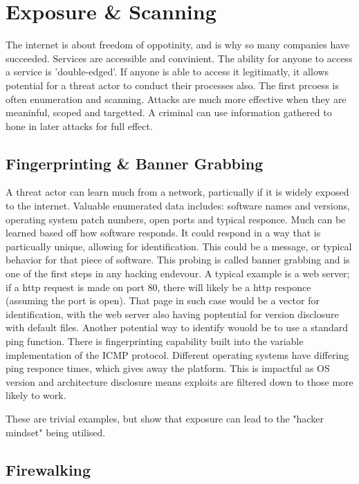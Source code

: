 \section{Exposure \& Scanning}
The internet is about freedom of oppotinity, and is why so many companies have succeeded. Services are accessible and convinient. The ability for anyone to access a service is 'double-edged'.
If anyone is able to access it legitimatly, it allows potential for a threat actor to conduct their processes also. The first prcoess is often enumeration and scanning. Attacks are much more effective when they are meaninful, scoped and targetted.
A criminal can use information gathered to hone in later attacks for full effect.  

\subsection{Fingerprinting \& Banner Grabbing}
A threat actor can learn much from a network, particually if it is widely exposed to the internet. Valuable enumerated data includes: software names and versions, operating system patch numbers, open ports and typical responce.
Much can be learned based off how software responds. It could respond in a way that is particually unique, allowing for identification. This could be a message, or typical behavior for that piece of software.
This probing is called banner grabbing and is one of the first steps in any hacking endevour. A typical example is a web server; if a http request is made on port 80, there will likely be a http responce (assuming the port is open).
That page in such case would be a vector for identification, with the web server also having poptential for version disclosure with default files. Another potential way to identify wouold be to use a standard ping function. 
There is fingerprinting capability built into the variable implementation of the ICMP protocol. Different operating systems have differing ping responce times, which gives away the platform. 
This is impactful as OS version and architecture disclosure means exploits are filtered down to those more likely to work.

These are trivial examples, but show that exposure can lead to the "hacker mindset" being utilised.




\subsection{Firewalking}

